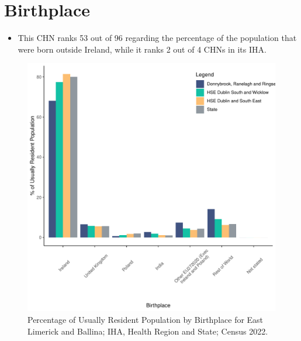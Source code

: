 \documentclass{article}
\begin{document}
\section{Birthplace}\label{sect:Birth}
\begin{itemize}
\item This CHN ranks  53 out of 96 regarding the percentage of the population that were born outside Ireland, while it ranks  2 out of 4 CHNs in its IHA.
\end{itemize}
\begin{figure}[H]
	\centering
	\includegraphics[width = 130mm]{../figures/BirthED.pdf}
	\caption{Percentage of Usually Resident Population by Birthplace for East Limerick and Ballina; IHA, Health Region and State; Census 2022.}
	\label{fig:vbnv}
	\end{figure}
	
\end{document}
